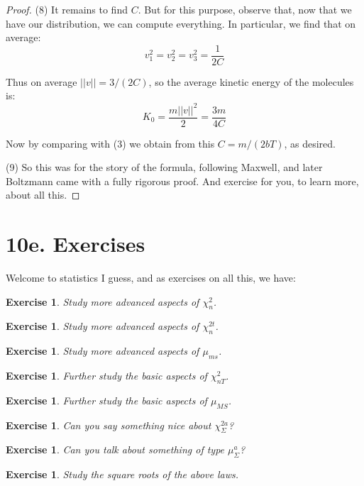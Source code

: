 \documentclass[12pt]{amsbook}
\newtheorem{exercise}[theorem]{Exercise}
\begin{document}
\begin{proof}
(8) It remains to find $C$. But for this purpose, observe that, now that we have our distribution, we can compute everything. In particular, we find that on average:
$$v_1^2=v_2^2=v_3^2=\frac{1}{2C}$$

Thus on average $||v||=3/(2C)$, so the average kinetic energy of the molecules is:
$$K_0=\frac{m||v||^2}{2}=\frac{3m}{4C}$$

Now by comparing with (3) we obtain from this $C=m/(2bT)$, as desired.

\medskip

(9) So this was for the story of the formula, following Maxwell, and later Boltzmann came with a fully rigorous proof. And exercise for you, to learn more, about all this.
\end{proof}

\section*{10e. Exercises}

Welcome to statistics I guess, and as exercises on all this, we have:

\begin{exercise}
Study more advanced aspects of $\chi_n^2$.
\end{exercise}

\begin{exercise}
Study more advanced aspects of $\chi_n^{2t}$.
\end{exercise}

\begin{exercise}
Study more advanced aspects of $\mu_{ms}$.
\end{exercise}

\begin{exercise}
Further study the basic aspects of $\chi_{nT}^2$.
\end{exercise}

\begin{exercise}
Further study the basic aspects of $\mu_{MS}$.
\end{exercise}

\begin{exercise}
Can you say something nice about $\chi_\Sigma^{2a}$?
\end{exercise}

\begin{exercise}
Can you talk about something of type $\mu_\Sigma^a$?
\end{exercise}

\begin{exercise}
Study the square roots of the above laws.
\end{exercise}
\end{document}
